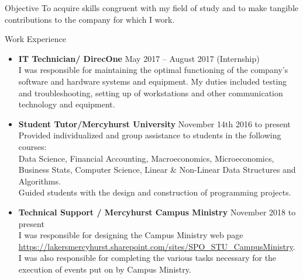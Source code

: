 \documentclass[11pt]{resume} %
\newcommand{\bold}[1]{\textbf{#1}}
\begin{document}
	
\begin{rSection}{Objective}
	To acquire skills congruent with my field of study and to make tangible contributions to the company for which I work.
\end{rSection}
\begin{rSection}{Work Experience}
\begin{itemize}
	\item\bold{IT Technician/ DirecOne} \quad May 2017 – August 2017 (Internship)\\
	I was responsible for maintaining the optimal functioning of the company’s software and hardware systems and equipment. My duties included testing and troubleshooting, setting up of workstations and other communication technology and equipment.\\
	
	\item\bold{Student Tutor/Mercyhurst University} \quad November 14th 2016 to present\\
	Provided individualized and group assistance to students in the following courses:\\ Data Science, Financial Accounting, Macroeconomics, Microeconomics, Business Stats, Computer Science, Linear \& Non-Linear Data Structures and Algorithms.\\
	Guided students with the design and construction of programming projects.
	\\
	\item\bold{Technical Support / Mercyhurst Campus Ministry} \quad November 2018 to present\\
	 I was responsible for designing the Campus Ministry web page  \url{https://lakersmercyhurst.sharepoint.com/sites/SPO_STU_CampusMinistry}.\\
	I was also responsible for completing the various tasks necessary for the execution of events put on by Campus Ministry.\\
		
	
\end{itemize}
\end{rSection}
\end{document}
